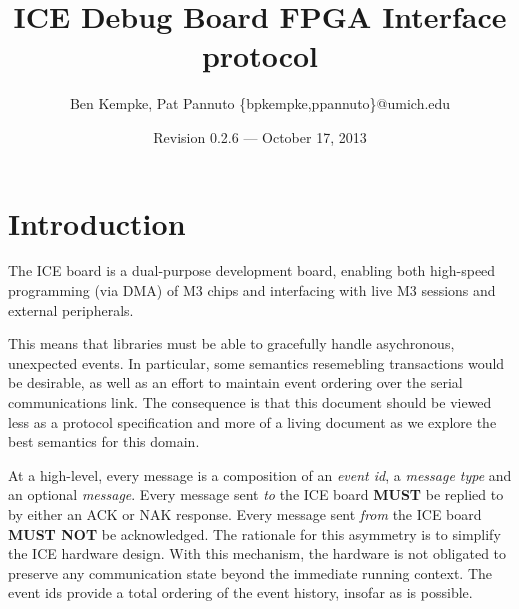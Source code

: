 \documentclass{article}
\begin{document}
\pagestyle{fancyplain}

\title{ICE Debug Board FPGA Interface protocol}
\author{Ben Kempke, Pat Pannuto \{bpkempke,ppannuto\}@umich.edu}
\date{Revision 0.2.6 --- October 17, 2013}
\maketitle

\section*{Introduction}
The ICE board is a dual-purpose development board, enabling both high-speed
programming (via DMA) of M3 chips and interfacing with live M3 sessions and
external peripherals.

This means that libraries must be able to gracefully handle asychronous,
unexpected events. In particular, some semantics resemebling transactions
would be desirable, as well as an effort to maintain event ordering over the
serial communications link. The consequence is that this document should be
viewed less as a protocol specification and more of a living document as we
explore the best semantics for this domain.

At a high-level, every message is a composition of an {\em event id}, a
{\em message type} and an optional {\em message}. Every message sent {\em to}
the ICE board {\bf MUST} be replied to by either an ACK or NAK response.
Every message sent {\em from} the ICE board {\bf MUST
NOT} be acknowledged. The rationale for this asymmetry is to simplify the ICE
hardware design. With this mechanism, the hardware is not obligated to
preserve any communication state beyond the immediate running context. The
event ids provide a total ordering of the event history, insofar as is
possible.

\setcounter{tocdepth}{2}
\tableofcontents
\end{document}
